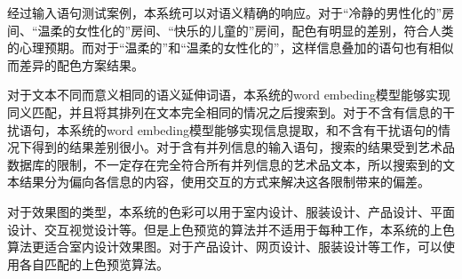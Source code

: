 经过输入语句测试案例，本系统可以对语义精确的响应。对于“冷静的男性化的”房间、“温柔的女性化的”房间、“快乐的儿童的”房间，配色有明显的差别，符合人类的心理预期。而对于“温柔的”和“温柔的女性化的”，这样信息叠加的语句也有相似而差异的配色方案结果。

对于文本不同而意义相同的语义延伸词语，本系统的word embeding模型能够实现同义匹配，并且将其排列在文本完全相同的情况之后搜索到。对于不含有信息的干扰语句，本系统的word embeding模型能够实现信息提取，和不含有干扰语句的情况下得到的结果差别很小。对于含有并列信息的输入语句，搜索的结果受到艺术品数据库的限制，不一定存在完全符合所有并列信息的艺术品文本，所以搜索到的文本结果分为偏向各信息的内容，使用交互的方式来解决这各限制带来的偏差。

对于效果图的类型，本系统的色彩可以用于室内设计、服装设计、产品设计、平面设计、交互视觉设计等。但是上色预览的算法并不适用于每种工作，本系统的上色算法更适合室内设计效果图。对于产品设计、网页设计、服装设计等工作，可以使用各自匹配的上色预览算法。







